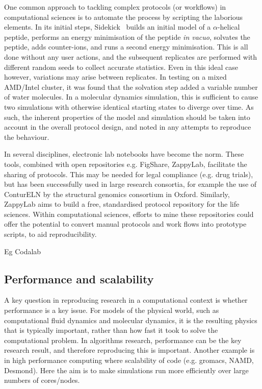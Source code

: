 \documentclass[conference]{IEEEtran}
\begin{document}
One common approach to tackling complex protocols (or workflows) 
in computational sciences is to automate the process by scripting
the laborious elements. In its initial steps, Sidekick~\cite{Hall2014Sidekick}
builds an initial model of a $\alpha$-helical peptide, performs an
energy minimisation of the peptide \emph{in vacuo}, solvates the peptide,
adds counter-ions, and runs a second energy minimisation. This is all
done without any user actions, and the subsequent replicates are performed
with different random seeds to collect accurate statistics. Even in this 
ideal case however, variations may arise between replicates. In testing 
on a mixed AMD/Intel cluster, it was found that the solvation step added
a variable number of water molecules. In a molecular dynamics simulation, 
this is sufficient to cause two simulations with otherwise identical 
starting states to diverge over time. As such, the inherent properties
of the model and simulation should be taken into account in the overall
protocol design, and noted in any attempts to reproduce the behaviour.

In several disciplines, electronic lab notebooks have become the
norm. These tools, combined with open repositories e.g. FigShare,
ZappyLab, facilitate the sharing of protocols. This may be needed for
legal compliance (e.g. drug trials), but has been successfully used in
large research consortia, for example the use of ConturELN by the
structural genomics consortium in Oxford. Similarly, ZappyLab aims to
build a free, standardised protocol repository for the life
sciences. Within computational sciences, efforts to mine these
repositories could offer the potential to convert manual protocols and
work flows into prototype scripts, to aid reproducibility.

Eg Codalab


\subsection{Performance and scalability}

A key question in reproducing research in a computational context is 
whether performance is a key issue. For models of the physical world, 
such as computational fluid dynamics and molecular dynamics, it is the 
resulting physics that is typically important, rather than how fast it took to 
solve the computational problem. In algorithms research, performance can be
the key research result, and therefore reproducing this is important. Another 
example is in high performance computing where scalability of code (e.g. gromacs,
NAMD, Desmond). Here the aim is to make simulations run more efficiently
over large numbers of cores/nodes. 
\end{document}
